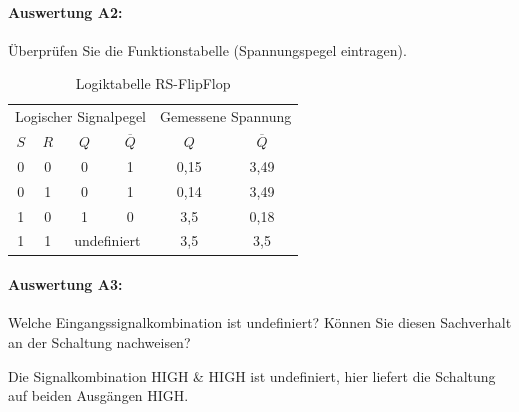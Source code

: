 \documentclass[11pt,a4paper,titlepage]{scrreprt}
\begin{document}
        \paragraph{Auswertung A2:} Überprüfen Sie die Funktionstabelle (Spannungspegel eintragen).

          \begin{center}
              \begin{table}[!hbtp]
                  \caption{Logiktabelle RS-FlipFlop}
                  \renewcommand{\arraystretch}{1.3}
                  \begin{center}
                      \begin{tabular}{cc|cc|cc}
                          \multicolumn{4}{c|}{Logischer Signalpegel} &\multicolumn{2}{c}{Gemessene Spannung}\\
                          $S$ & $R$ & $Q$ & $\overline{Q}$ & $Q$ & $\overline{Q}$\\ \hline
                          0 & 0 & 0 & 1 & 0,15 & 3,49\\
                          0 & 1 & 0 & 1 & 0,14 & 3,49\\
                          1 & 0 & 1 & 0 & 3,5 & 0,18\\
                          1 & 1 & \multicolumn{2}{c|}{undefiniert} & 3,5 & 3,5
                      \end{tabular}
                  \end{center}
              \end{table}
          \end{center}
        \paragraph{Auswertung A3:} Welche Eingangssignalkombination ist undefiniert? Können Sie diesen Sachverhalt an
          der Schaltung nachweisen?

          Die Signalkombination HIGH \& HIGH ist undefiniert, hier liefert die Schaltung auf beiden Ausgängen HIGH.
\end{document}
